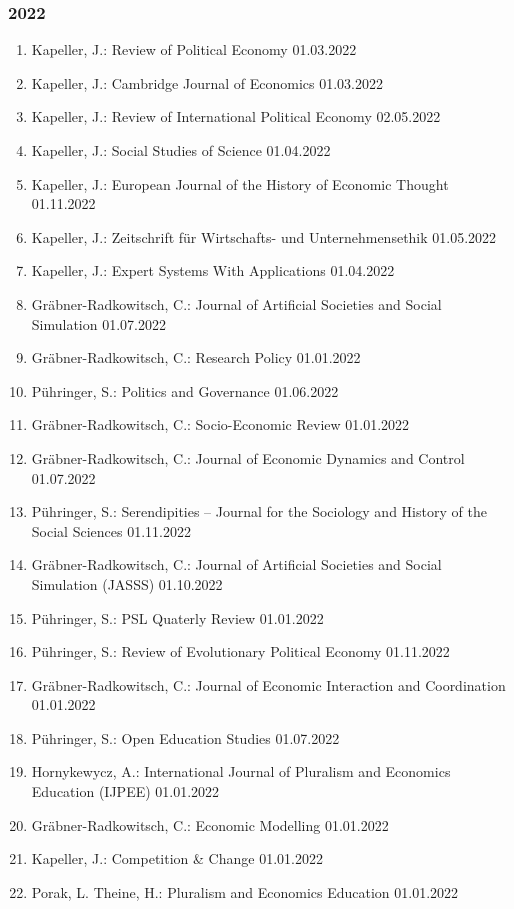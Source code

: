 \subsubsection*{2022}
\begin{enumerate}
	\item Kapeller, J.: Review of Political Economy 01.03.2022
	\item Kapeller, J.: Cambridge Journal of Economics 01.03.2022
	\item Kapeller, J.: Review of International Political Economy 02.05.2022
	\item Kapeller, J.: Social Studies of Science 01.04.2022
	\item Kapeller, J.: European Journal of the History of Economic Thought 01.11.2022
	\item Kapeller, J.: Zeitschrift für Wirtschafts- und Unternehmensethik 01.05.2022
	\item Kapeller, J.: Expert Systems With Applications 01.04.2022
	\item Gräbner-Radkowitsch, C.: Journal of Artificial Societies and Social Simulation 01.07.2022
	\item Gräbner-Radkowitsch, C.: Research Policy 01.01.2022
	\item Pühringer, S.: Politics and Governance 01.06.2022
	\item Gräbner-Radkowitsch, C.: Socio-Economic Review 01.01.2022
	\item Gräbner-Radkowitsch, C.: Journal of Economic Dynamics and Control 01.07.2022
	\item Pühringer, S.: Serendipities -- Journal for the Sociology and History of the Social Sciences 01.11.2022
	\item Gräbner-Radkowitsch, C.: Journal of Artificial Societies and Social Simulation (JASSS) 01.10.2022
	\item Pühringer, S.: PSL Quaterly Review 01.01.2022
	\item Pühringer, S.: Review of Evolutionary Political Economy 01.11.2022
	\item Gräbner-Radkowitsch, C.: Journal of Economic Interaction and Coordination 01.01.2022
	\item Pühringer, S.: Open Education Studies 01.07.2022
	\item Hornykewycz, A.: International Journal of Pluralism and Economics Education (IJPEE) 01.01.2022
	\item Gräbner-Radkowitsch, C.: Economic Modelling 01.01.2022
	\item Kapeller, J.: Competition \& Change 01.01.2022
	\item Porak, L. Theine, H.: Pluralism and Economics Education 01.01.2022
\end{enumerate}
